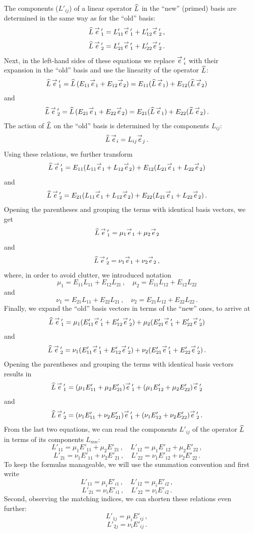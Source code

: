The components ($L'_{ij}$) of a linear operator $\widehat{L}$ in the ``new''
(primed) basis are determined in the same way as for the ``old''
basis:
\[
\widehat{L}\, \overset{\rightarrow}{e}\,'_1 = L'_{11}\overset{\rightarrow}{e}\,'_1 + L'_{12}\overset{\rightarrow}{e}\,'_2\,,
\]
\[
\widehat{L}\, \overset{\rightarrow}{e}\,'_2 = L'_{21}\overset{\rightarrow}{e}\,'_1 + L'_{22}\overset{\rightarrow}{e}\,'_2\,.
\]
Next, in the left-hand sides of these equations we replace $\overset{\rightarrow}{e}\,'_i$
with their expansion in the ``old'' basis and use the linearity of the
operator $\widehat{L}$:
\[
\widehat{L}\,\overset{\rightarrow}{e}\,'_1 = \widehat{L}\,(E_{11}\overset{\rightarrow}{e}_1 + E_{12}\overset{\rightarrow}{e}_2) =
E_{11}(\widehat{L}\,\overset{\rightarrow}{e}_1)+E_{12}(\widehat{L}\,\overset{\rightarrow}{e}_2)
\]
and
\[
\widehat{L}\,\overset{\rightarrow}{e}\,'_2 = \widehat{L}\,(E_{21}\overset{\rightarrow}{e}_1 + E_{22}\overset{\rightarrow}{e}_2) =
E_{21}(\widehat{L}\,\overset{\rightarrow}{e}_1)+E_{22}(\widehat{L}\,\overset{\rightarrow}{e}_2)\,.
\]
The action of $\widehat{L}$ on the ``old'' basis is determined by the
components $L_{ij}$:
\[
\widehat{L}\, \overset{\rightarrow}{e}_i = L_{ij}\overset{\rightarrow}{e}_j\,.
\]
Using these relations, we further transform
\[
\widehat{L}\, \overset{\rightarrow}{e}\,'_1 = E_{11}(L_{11}\overset{\rightarrow}{e}_1+L_{12}\overset{\rightarrow}{e}_2) + E_{12}(L_{21}\overset{\rightarrow}{e}_1+L_{22}\overset{\rightarrow}{e}_2)
\]
and
\[
\widehat{L}\, \overset{\rightarrow}{e}\,'_2 = E_{21}(L_{11}\overset{\rightarrow}{e}_1+L_{12}\overset{\rightarrow}{e}_2) + E_{22}(L_{21}\overset{\rightarrow}{e}_1+L_{22}\overset{\rightarrow}{e}_2)\,.
\]
Opening the parentheses and grouping the terms with identical basis
vectors, we get
\[
\widehat{L}\,\overset{\rightarrow}{e}\,'_1 = \mu_1 \overset{\rightarrow}{e}_1 + \mu_2\overset{\rightarrow}{e}_2
\]
and
\[
\widehat{L}\,\overset{\rightarrow}{e}\,'_2 = \nu_1 \overset{\rightarrow}{e}_1 + \nu_2\overset{\rightarrow}{e}_2\,,
\]
where, in order to avoid clutter, we introduced notation
\[
\mu_1 = E_{11}L_{11} + E_{12}L_{21}\,,\quad \mu_2 = E_{11}L_{12} + E_{12}L_{22}
\]
and
\[
\nu_1 = E_{21}L_{11} + E_{22}L_{21}\,,\quad \nu_2 = E_{21}L_{12} + E_{22}L_{22}\,.
\]
Finally, we expand the ``old'' basis vectors in terms of the ``new''
ones, to arrive at
\[
\widehat{L}\,\overset{\rightarrow}{e}\,'_1 = \mu_1(E'_{11}\overset{\rightarrow}{e}\,'_1 +
E'_{12}\overset{\rightarrow}{e}\,'_2)+\mu_2(E'_{21}\overset{\rightarrow}{e}\,'_1+E'_{22}\overset{\rightarrow}{e}\,'_2)
\]
and
\[
\widehat{L}\,\overset{\rightarrow}{e}\,'_2 = \nu_1(E'_{11}\overset{\rightarrow}{e}\,'_1 +
E'_{12}\overset{\rightarrow}{e}\,'_2)+\nu_2(E'_{21}\overset{\rightarrow}{e}\,'_1+E'_{22}\overset{\rightarrow}{e}\,'_2)\,.
\]
Opening the parentheses and grouping the terms with identical basis
vectors results in
\[
\widehat{L}\,\overset{\rightarrow}{e}\,'_1 = (\mu_1E'_{11}+\mu_2E'_{21})\overset{\rightarrow}{e}\,'_1 + (\mu_1E'_{12}+\mu_2E'_{22})\overset{\rightarrow}{e}\,'_2
\]
and
\[
\widehat{L}\,\overset{\rightarrow}{e}\,'_2 = (\nu_1E'_{11}+\nu_2E'_{21})\overset{\rightarrow}{e}\,'_1 + (\nu_1E'_{12}+\nu_2E'_{22})\overset{\rightarrow}{e}\,'_2\,.
\]
From the last two equations, we can read the components $L'_{ij}$ of
the operator $\widehat{L}$ in terms of its components $L_{mn}$:
\[
L'_{11} = \mu_1E'_{11} + \mu_2E'_{21}\,,\quad L'_{12}=\mu_1E'_{12}+\mu_2E'_{22}\,,
\]
\[
L'_{21} = \nu_1E'_{11} + \nu_2E'_{21}\,,\quad L'_{22}=\nu_1E'_{12}+\nu_2E'_{22}\,.
\]
To keep the formulas manageable, we will use the summation convention
and first write
\[
L'_{11} = \mu_iE'_{i1}\,,\quad L'_{12}=\mu_iE'_{i2}\,,
\]
\[
L'_{21} = \nu_iE'_{i1}\,,\quad L'_{22}=\nu_iE'_{i2}\,.
\]
Second, observing the matching indices, we can shorten these relations
even further:
\[
L'_{1j} = \mu_iE'_{ij}\,,
\]
\[
L'_{2j} = \nu_iE'_{ij}\,.
\]

